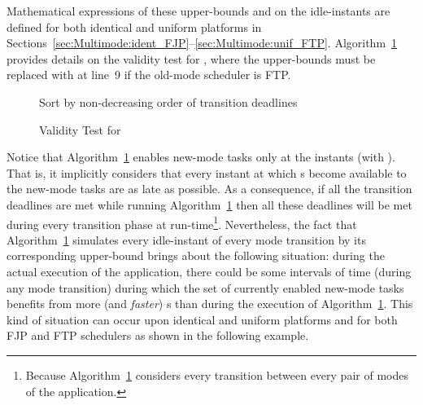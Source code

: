\documentclass{article}
\newtheorem{validity test}{Validity Test}
\begin{document}
Mathematical expressions of these upper-bounds  and  on the  idle-instants are defined for both identical and uniform platforms in Sections~\ref{sec:Multimode:ident_FJP}--\ref{sec:Multimode:unif_FTP}. Algorithm~\ref{algo:AMMSO_test} provides details on the validity test for , where the upper-bounds  must be replaced with  at line~9 if the old-mode scheduler is FTP. 

\begin{figure}[h!]
\begin{center}
\begin{minipage}{10cm}
\begin{algorithmic}[1]
\REQUIRE 
{}
	\STATE 
	\STATE 
	\STATE  
	\STATE Sort  by non-decreasing order of transition deadlines
	\FOR{()}
		\STATE 
			\IF{()}
				\RETURN \FALSE
			\ENDIF
			\IF{()}
				\STATE 
				\STATE 
			\ENDIF
		\ENDFOR
	\ENDFOR
\ENDFOR
\RETURN \TRUE
\end{algorithmic}
\end{minipage}
\end{center}
\caption{Validity Test for }
\label{algo:AMMSO_test}
\end{figure}

Notice that Algorithm~\ref{algo:AMMSO_test} enables new-mode tasks only at the instants  (with ). That is, it implicitly considers that every instant at which s become available to the new-mode tasks are as late as possible. As a consequence, if all the transition deadlines are met while running Algorithm~\ref{algo:AMMSO_test} then all these deadlines will be met during every transition phase at run-time\footnote{Because Algorithm~\ref{algo:AMMSO_test} considers every transition between every pair of modes of the application.}. Nevertheless, the fact that Algorithm~\ref{algo:AMMSO_test} simulates every idle-instant of every mode transition by its corresponding upper-bound  brings about the following situation: during the actual execution of the application, there could be some intervals of time (during any mode transition) during which the set of currently enabled new-mode tasks benefits from more (and \emph{faster}) s than during the execution of Algorithm~\ref{algo:AMMSO_test}. This kind of situation can occur upon identical and uniform platforms and for both FJP and FTP schedulers as shown in the following example. 
\end{document}
